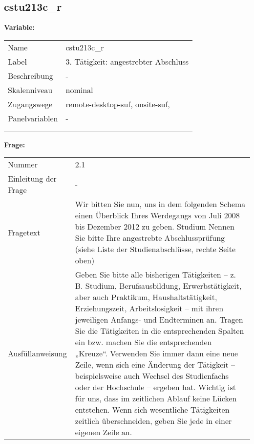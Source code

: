 	
	
	\subsection{cstu213c\_r}
	\label{subSection:cstu213c_r}

	\noindent\textbf{Variable:}\\
		\begin{tabular}{lL{11.3cm}}
			\label{tableVariable:cstu213c_r}
			Name & cstu213c\_r \\
			Label & 3. Tätigkeit: angestrebter Abschluss \\
			Beschreibung & - \\
			Skalenniveau & nominal \\
			Zugangswege &
				remote-desktop-suf,
				onsite-suf,
 \\
			Panelvariablen & -
			 \\
			 \\
 \\
		\end{tabular}

		\vspace*{1 cm}
		\noindent\textbf{Frage:}\\
		\begin{tabular}{lL{11.3cm}}
			\label{tableQuestion:cstu213c_r}
			Nummer & 2.1 \\
			Einleitung der Frage & - \\
			Fragetext & Wir bitten Sie nun, uns in dem folgenden Schema einen Überblick Ihres Werdegangs von Juli 2008 bis Dezember 2012 zu geben.
Studium
Nennen Sie bitte Ihre angestrebte Abschlussprüfung 
(siehe Liste der Studienabschlüsse, rechte Seite oben) \\
			Ausfüllanweisung & Geben Sie bitte alle bisherigen Tätigkeiten – z. B. Studium, Berufsausbildung, Erwerbstätigkeit, aber auch Praktikum, Haushaltstätigkeit,
Erziehungszeit, Arbeitslosigkeit – mit ihren jeweiligen Anfangs- und Endterminen an. Tragen Sie die Tätigkeiten in die entsprechenden Spalten ein bzw. machen Sie die entsprechenden „Kreuze“. Verwenden Sie immer dann eine neue Zeile, wenn sich eine Änderung der Tätigkeit – beispielsweise auch Wechsel des Studienfachs oder der Hochschule – ergeben hat. Wichtig ist für uns, dass im zeitlichen Ablauf keine Lücken entstehen. Wenn sich wesentliche Tätigkeiten zeitlich überschneiden, geben Sie jede in einer eigenen Zeile an. \\
		\end{tabular}





